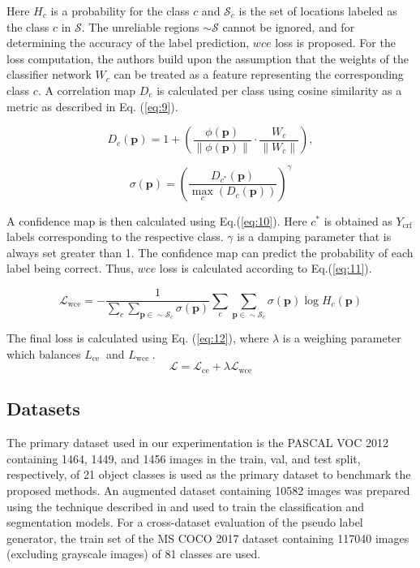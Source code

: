 Here $H_{c}$ is a probability for the class $c$ and $\mathcal{S}_{c}$ is the set of locations labeled as the class $c$ in $\mathcal{S}$. The unreliable regions $\sim \mathcal{S}$ cannot be ignored, and for determining the accuracy of the label prediction, $wce$ loss is proposed.
For the loss computation, the authors build upon the assumption that the weights of the classifier network $W_{c}$ can be treated as a feature representing the corresponding class $c$. A correlation map $D_{\text {c}}$ is calculated per class using cosine similarity as a metric as described in Eq. (\ref{eq:9}).

\begin{equation} \label{eq:9}
D_{c}(\mathbf{p})=1+\left(\frac{\phi(\mathbf{p})}{\|\phi(\mathbf{p})\|} \cdot \frac{W_{c}}{\left\|W_{c}\right\|}\right),
\end{equation}

\begin{equation} \label{eq:10}
\sigma(\mathbf{p})=\left(\frac{D_{c^{*}}(\mathbf{p})}{\max _{c}\left(D_{c}(\mathbf{p})\right)}\right)^{\gamma}
\end{equation}

A confidence map is then calculated using Eq.(\ref{eq:10}). Here $c^{*}$ is obtained as $Y_{\text {crf}}$ labels corresponding to the respective class. $\gamma$ is a damping parameter that is always set greater than 1. The confidence map can predict the probability of each label being correct. Thus, $wce$ loss is calculated according to Eq.(\ref{eq:11}).

\begin{equation} \label{eq:11}
\mathcal{L}_{\mathrm{wce}}=-\frac{1}{\sum_{c} \sum_{\mathbf{p} \in \sim \mathcal{S}_{c}} \sigma(\mathbf{p})} \sum_{c} \sum_{\mathbf{p} \in \sim \mathcal{S}_{c}} \sigma(\mathbf{p}) \log H_{c}(\mathbf{p})
\end{equation}

The final loss is calculated using Eq. (\ref{eq:12}), where $\lambda$ is a weighing parameter which balances $L_{\text {ce }}$ and $L_{\text {wce }}$.
\begin{equation} \label{eq:12}
\mathcal{L}=\mathcal{L}_{\mathrm{ce}}+\lambda \mathcal{L}_{\mathrm{wce}}
\end{equation}

\subsection{Datasets}
The primary dataset used in our experimentation is the PASCAL VOC 2012 containing 1464, 1449, and 1456 images in the train, val, and test split, respectively, of 21 object classes is used as the primary dataset to benchmark the proposed methods. An augmented dataset containing 10582 images was prepared using the technique described in \cite{hariharan2011semantic} and used to train the classification and segmentation models. For a cross-dataset evaluation of the pseudo label generator, the train set of the MS COCO 2017 dataset \cite{coco} containing 117040 images (excluding grayscale images) of 81 classes are used.

